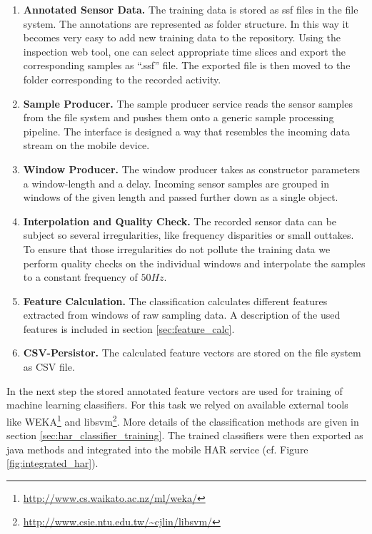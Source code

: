\begin{enumerate}
  \item {\bf Annotated Sensor Data.} The training data is stored as
    ssf files in the file system. The annotations are represented as
    folder structure. In this way it becomes very easy to add new
    training data to the repository. Using the inspection web tool,
    one can select appropriate time slices and export the
    corresponding samples as ``.ssf'' file. The exported file is then
    moved to the folder corresponding to the recorded activity.
  \item {\bf Sample Producer.} The sample producer service reads the 
    sensor samples from the file system and pushes them onto a generic 
    sample processing pipeline. The interface is designed a way that
    resembles the incoming data stream on the mobile device.
  \item {\bf Window Producer.} The window producer takes as
    constructor parameters a window-length and a delay. Incoming
    sensor samples are grouped in windows of the given length and
    passed further down as a single object.
  \item {\bf Interpolation and Quality Check.}  
    The recorded sensor data can be subject so several irregularities,
    like frequency disparities or small outtakes. To ensure that those
    irregularities do not pollute the training data we perform quality
    checks on the individual windows and interpolate the samples to a
    constant frequency of $50Hz$.
  \item {\bf Feature Calculation.} The classification calculates
    different features extracted from windows of raw sampling data. A
    description of the used features is included in section
    \ref{sec:feature_calc}.
  \item {\bf CSV-Persistor.} The calculated feature vectors are stored
    on the file system as CSV file. 
\end{enumerate}

In the next step the stored annotated feature vectors are used for
training of machine learning classifiers. For this task we relyed on 
available external tools like
WEKA\footnote{\url{http://www.cs.waikato.ac.nz/ml/weka/}}
and libsvm\footnote{\url{http://www.csie.ntu.edu.tw/~cjlin/libsvm/}}.
More details of the classification methods are given in section
\ref{sec:har_classifier_training}.
The trained classifiers were then exported as java methods and
integrated into the mobile HAR service (cf. Figure \ref{fig:integrated_har}).

